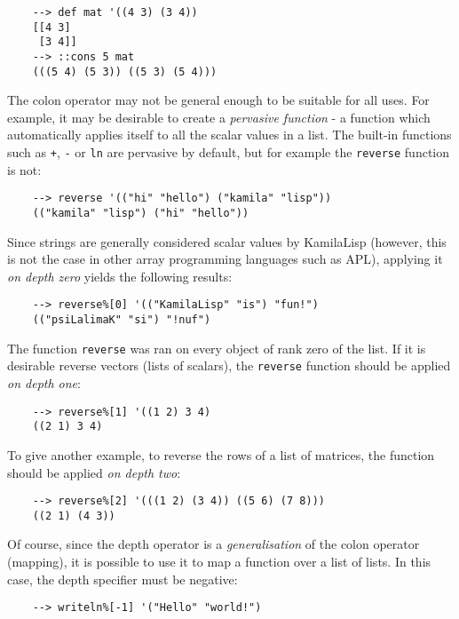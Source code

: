 \begin{Verbatim}
    --> def mat '((4 3) (3 4))
    [[4 3]
     [3 4]]
    --> ::cons 5 mat
    (((5 4) (5 3)) ((5 3) (5 4)))
\end{Verbatim}

The colon operator may not be general enough to be suitable for all uses. For example, it may be desirable to create a \textit{pervasive function} - a function which automatically applies itself to all the scalar values in a list. The built-in functions such as \verb|+|, \verb|-| or \verb|ln| are pervasive by default, but for example the \verb|reverse| function is not:

\begin{Verbatim}
    --> reverse '(("hi" "hello") ("kamila" "lisp"))
    (("kamila" "lisp") ("hi" "hello"))
\end{Verbatim}

Since strings are generally considered scalar values by KamilaLisp (however, this is not the case in other array programming languages such as APL), applying it \textit{on depth zero} yields the following results:

\begin{Verbatim}
    --> reverse%[0] '(("KamilaLisp" "is") "fun!")
    (("psiLalimaK" "si") "!nuf")
\end{Verbatim}

The function \verb|reverse| was ran on every object of rank zero of the list. If it is desirable reverse vectors (lists of scalars), the \verb|reverse| function should be applied \textit{on depth one}:

\begin{Verbatim}
    --> reverse%[1] '((1 2) 3 4)
    ((2 1) 3 4)
\end{Verbatim}

To give another example, to reverse the rows of a list of matrices, the function should be applied \textit{on depth two}:

\begin{Verbatim}
    --> reverse%[2] '(((1 2) (3 4)) ((5 6) (7 8)))
    ((2 1) (4 3))
\end{Verbatim}

Of course, since the depth operator is a \textit{generalisation} of the colon operator (mapping), it is possible to use it to map a function over a list of lists. In this case, the depth specifier must be negative:

\begin{Verbatim}
    --> writeln%[-1] '("Hello" "world!")
\end{Verbatim}

